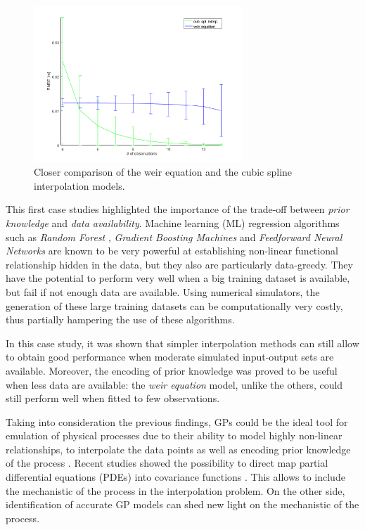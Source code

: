 \begin{figure}[h]
  \centering
  \includegraphics[width=0.7\textwidth]{Figures/fitting_std.png}
  \caption{Closer comparison of the weir equation and the cubic spline interpolation models.}
  \label{fig:fitting_std}
\end{figure}


This first case studies highlighted the importance of the trade-off between \emph{prior knowledge} and \emph{data availability}.
Machine learning (ML) regression algorithms such as \emph{Random Forest} \autocite{breiman_random_2001}, \emph{Gradient Boosting Machines} \autocite{friedman_greedy_2001} and \emph{Feedforward Neural Networks} \autocite{james_introduction_2013} are known to be very powerful at establishing non-linear functional relationship hidden in the data, but they also are particularly data-greedy. They have the potential to perform very well when a big training dataset is available, but fail if not enough data are available. Using numerical simulators, the generation of these large training datasets can be computationally very costly, thus partially hampering the use of these algorithms.

In this case study, it was shown that simpler interpolation methods can still allow to obtain good performance when  moderate simulated input-output sets are available. 
Moreover, the encoding of prior knowledge was proved to be useful when less data are available: the \emph{weir equation} model, unlike the others, could still perform well when fitted to few observations.

Taking into consideration the previous findings, GPs could be the ideal tool for emulation of physical processes due to their ability to model highly non-linear relationships, to interpolate the data points as well as encoding prior knowledge of the process \autocite{rasmussen_gaussian_2010}. Recent studies showed the possibility to direct map partial differential equations (PDEs) into covariance functions \autocite{lindgren_explicit_2011}. This allows to include the mechanistic of the process in the interpolation problem. On the other side, identification of accurate GP models can shed new light on the mechanistic of the process.

